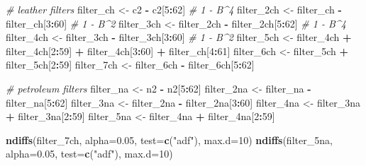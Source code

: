 \documentclass[
  11pt,
]{article}
\newenvironment{Shaded}{\begin{snugshade}}{\end{snugshade}}
\newcommand{\AttributeTok}[1]{\textcolor[rgb]{0.13,0.29,0.53}{#1}}
\newcommand{\CommentTok}[1]{\textcolor[rgb]{0.56,0.35,0.01}{\textit{#1}}}
\newcommand{\DecValTok}[1]{\textcolor[rgb]{0.00,0.00,0.81}{#1}}
\newcommand{\FloatTok}[1]{\textcolor[rgb]{0.00,0.00,0.81}{#1}}
\newcommand{\FunctionTok}[1]{\textcolor[rgb]{0.13,0.29,0.53}{\textbf{#1}}}
\newcommand{\NormalTok}[1]{#1}
\newcommand{\OtherTok}[1]{\textcolor[rgb]{0.56,0.35,0.01}{#1}}
\newcommand{\SpecialCharTok}[1]{\textcolor[rgb]{0.81,0.36,0.00}{\textbf{#1}}}
\newcommand{\StringTok}[1]{\textcolor[rgb]{0.31,0.60,0.02}{#1}}
\begin{document}
\begin{Shaded}
\begin{Highlighting}[]
\CommentTok{\# leather filters}
\NormalTok{filter\_ch  }\OtherTok{\textless{}{-}}\NormalTok{ c2 }\SpecialCharTok{{-}}\NormalTok{ c2[}\DecValTok{5}\SpecialCharTok{:}\DecValTok{62}\NormalTok{]                 }\CommentTok{\# 1 {-} B\^{}4}
\NormalTok{filter\_2ch }\OtherTok{\textless{}{-}}\NormalTok{ filter\_ch }\SpecialCharTok{{-}}\NormalTok{ filter\_ch[}\DecValTok{3}\SpecialCharTok{:}\DecValTok{60}\NormalTok{]   }\CommentTok{\# 1 {-} B\^{}2}
\NormalTok{filter\_3ch }\OtherTok{\textless{}{-}}\NormalTok{ filter\_2ch }\SpecialCharTok{{-}}\NormalTok{ filter\_2ch[}\DecValTok{5}\SpecialCharTok{:}\DecValTok{62}\NormalTok{] }\CommentTok{\# 1 {-} B\^{}4}
\NormalTok{filter\_4ch }\OtherTok{\textless{}{-}}\NormalTok{ filter\_3ch }\SpecialCharTok{{-}}\NormalTok{ filter\_3ch[}\DecValTok{3}\SpecialCharTok{:}\DecValTok{60}\NormalTok{] }\CommentTok{\# 1 {-} B\^{}2}
\NormalTok{filter\_5ch }\OtherTok{\textless{}{-}}\NormalTok{ filter\_4ch }\SpecialCharTok{+}\NormalTok{ filter\_4ch[}\DecValTok{2}\SpecialCharTok{:}\DecValTok{59}\NormalTok{] }\SpecialCharTok{+}\NormalTok{ filter\_4ch[}\DecValTok{3}\SpecialCharTok{:}\DecValTok{60}\NormalTok{] }\SpecialCharTok{+}\NormalTok{ filter\_ch[}\DecValTok{4}\SpecialCharTok{:}\DecValTok{61}\NormalTok{]}
\NormalTok{filter\_6ch }\OtherTok{\textless{}{-}}\NormalTok{ filter\_5ch }\SpecialCharTok{+}\NormalTok{ filter\_5ch[}\DecValTok{2}\SpecialCharTok{:}\DecValTok{59}\NormalTok{]}
\NormalTok{filter\_7ch }\OtherTok{\textless{}{-}}\NormalTok{ filter\_6ch }\SpecialCharTok{{-}}\NormalTok{ filter\_6ch[}\DecValTok{5}\SpecialCharTok{:}\DecValTok{62}\NormalTok{]}

\CommentTok{\# petroleum filters}
\NormalTok{filter\_na  }\OtherTok{\textless{}{-}}\NormalTok{ n2 }\SpecialCharTok{{-}}\NormalTok{ n2[}\DecValTok{5}\SpecialCharTok{:}\DecValTok{62}\NormalTok{]}
\NormalTok{filter\_2na }\OtherTok{\textless{}{-}}\NormalTok{ filter\_na }\SpecialCharTok{{-}}\NormalTok{ filter\_na[}\DecValTok{5}\SpecialCharTok{:}\DecValTok{62}\NormalTok{]}
\NormalTok{filter\_3na }\OtherTok{\textless{}{-}}\NormalTok{ filter\_2na }\SpecialCharTok{{-}}\NormalTok{ filter\_2na[}\DecValTok{3}\SpecialCharTok{:}\DecValTok{60}\NormalTok{]}
\NormalTok{filter\_4na }\OtherTok{\textless{}{-}}\NormalTok{ filter\_3na }\SpecialCharTok{+}\NormalTok{ filter\_3na[}\DecValTok{2}\SpecialCharTok{:}\DecValTok{59}\NormalTok{]}
\NormalTok{filter\_5na }\OtherTok{\textless{}{-}}\NormalTok{ filter\_4na }\SpecialCharTok{+}\NormalTok{ filter\_4na[}\DecValTok{2}\SpecialCharTok{:}\DecValTok{59}\NormalTok{]}

\FunctionTok{ndiffs}\NormalTok{(filter\_7ch, }\AttributeTok{alpha=}\FloatTok{0.05}\NormalTok{, }\AttributeTok{test=}\FunctionTok{c}\NormalTok{(}\StringTok{"adf"}\NormalTok{), }\AttributeTok{max.d=}\DecValTok{10}\NormalTok{)}
\FunctionTok{ndiffs}\NormalTok{(filter\_5na, }\AttributeTok{alpha=}\FloatTok{0.05}\NormalTok{, }\AttributeTok{test=}\FunctionTok{c}\NormalTok{(}\StringTok{"adf"}\NormalTok{), }\AttributeTok{max.d=}\DecValTok{10}\NormalTok{)}
\end{Highlighting}
\end{Shaded}
\end{document}
